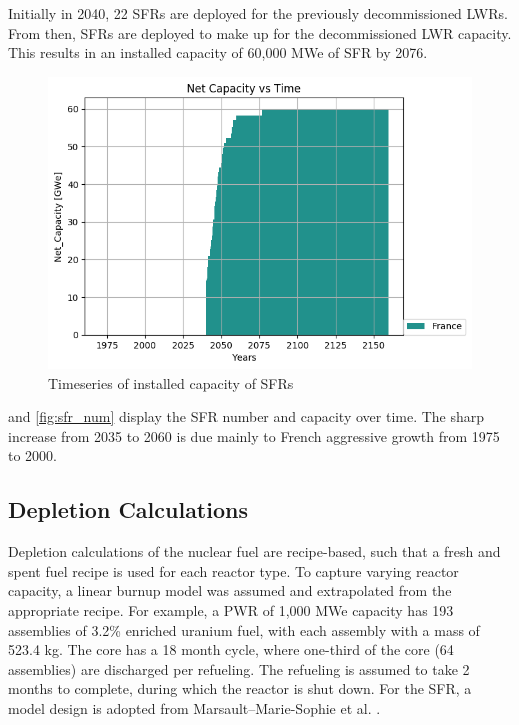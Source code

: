 Initially in 2040, 22 \gls{SFR}s
are deployed for the previously decommissioned
\gls{LWR}s. From then, \glspl{SFR} are deployed to
make up for the decommissioned \gls{LWR} capacity.
This results in an installed capacity of 60,000 MWe
of \gls{SFR} by 2076.

\begin{figure}[htbp!]
        \begin{center}
                \includegraphics[width=\columnwidth]{./images/french-transition/power_plot.png}
        \end{center}
        \caption{Timeseries of installed capacity of \gls{SFR}s}
        \label{fig:sfr_cap}
\end{figure}


 and \cref{fig:sfr_num} display
the \gls{SFR} number and capacity over time.
The sharp increase from 2035 to 2060 is due mainly to
French aggressive growth from 1975 to 2000.



\subsection{Depletion Calculations}
Depletion calculations of the nuclear fuel are recipe-based, such that a fresh 
and spent fuel recipe is used for each reactor type. To capture varying reactor 
capacity, a linear burnup model was assumed and extrapolated from the 
appropriate recipe. For example, a PWR of
1,000 MWe capacity has 193 assemblies of 3.2\% enriched
uranium fuel, with each assembly with a mass of 523.4 kg.
The core has a 18 month cycle, where one-third of the 
core (64 assemblies) are discharged per refueling. The refueling
is assumed to take 2 months to complete, during which the reactor
is shut down. For the \gls{SFR}, a model design is adopted from
Marsault–Marie-Sophie et al. \cite{marsaultmarie-sophie_pre-conceptual_2012}.

